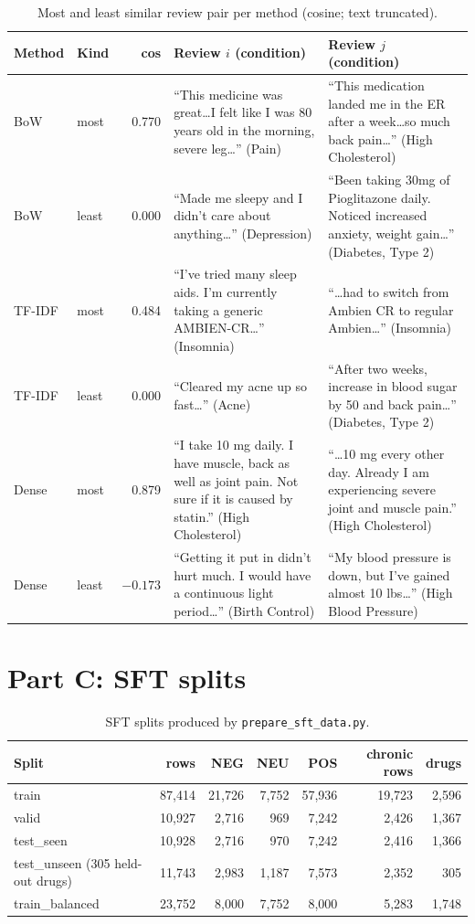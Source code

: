 \documentclass[11pt]{article}
\newcommand{\code}[1]{\texttt{#1}}
\begin{document}
\begin{table}[H]\centering\small
\caption{Most and least similar review pair per method (cosine; text truncated).}\label{tab:pairs}
\begin{tabular}{llrp{4.7cm}p{4.7cm}}\toprule
Method & Kind & cos & Review $i$ (condition) & Review $j$ (condition) \\\midrule
BoW & most & 0.770 & ``This medicine was great\ldots I felt like I was 80 years old in the morning, severe leg\ldots'' (Pain) & ``This medication landed me in the ER after a week\ldots so much back pain\ldots'' (High Cholesterol) \\
BoW & least & 0.000 & ``Made me sleepy and I didn't care about anything\ldots'' (Depression) & ``Been taking 30mg of Pioglitazone daily. Noticed increased anxiety, weight gain\ldots'' (Diabetes, Type 2) \\
TF-IDF & most & 0.484 & ``I've tried many sleep aids. I'm currently taking a generic AMBIEN-CR\ldots'' (Insomnia) & ``\ldots had to switch from Ambien CR to regular Ambien\ldots'' (Insomnia) \\
TF-IDF & least & 0.000 & ``Cleared my acne up so fast\ldots'' (Acne) & ``After two weeks, increase in blood sugar by 50 and back pain\ldots'' (Diabetes, Type 2) \\
Dense & most & 0.879 & ``I take 10 mg daily. I have muscle, back as well as joint pain. Not sure if it is caused by statin.'' (High Cholesterol) & ``\ldots 10 mg every other day. Already I am experiencing severe joint and muscle pain.'' (High Cholesterol) \\
Dense & least & $-0.173$ & ``Getting it put in didn't hurt much. I would have a continuous light period\ldots'' (Birth Control) & ``My blood pressure is down, but I've gained almost 10 lbs\ldots'' (High Blood Pressure) \\
\bottomrule\end{tabular}
\end{table}

\section{Part C: SFT splits}
\begin{table}[H]\centering\small
\caption{SFT splits produced by \code{prepare\_sft\_data.py}.}
\begin{tabular}{lrrrrrr}\toprule
Split & rows & NEG & NEU & POS & chronic rows & drugs \\\midrule
train & 87,414 & 21,726 & 7,752 & 57,936 & 19,723 & 2,596 \\
valid & 10,927 & 2,716 & 969 & 7,242 & 2,426 & 1,367 \\
test\_seen & 10,928 & 2,716 & 970 & 7,242 & 2,416 & 1,366 \\
test\_unseen (305 held-out drugs) & 11,743 & 2,983 & 1,187 & 7,573 & 2,352 & 305 \\
train\_balanced & 23,752 & 8,000 & 7,752 & 8,000 & 5,283 & 1,748 \\
\bottomrule\end{tabular}
\end{table}
\end{document}
